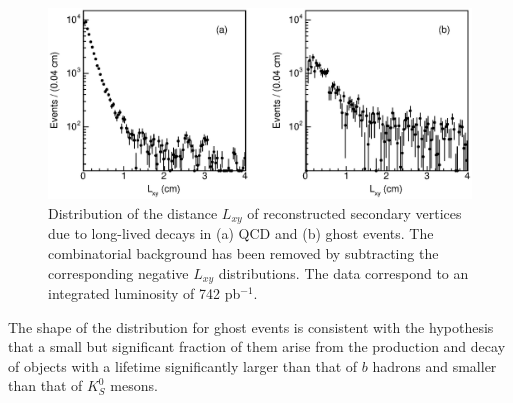\documentclass[aps,prd,preprint,floatfix,nofootinbib,superscriptaddress,showpacs,amssymb]{revtex4}
\begin{document}
 \begin{figure}
 \begin{center}
 \vspace{-0.3in}
 \leavevmode
 \includegraphics*[width=\textwidth]{nvilxy.eps}
 \caption[]{Distribution of the distance $L_{xy}$ of reconstructed secondary
            vertices due to long-lived decays in (a) QCD and (b) ghost events.
            The combinatorial background has been removed by subtracting the
            corresponding negative $L_{xy}$ distributions. The data correspond
            to an integrated luminosity of 742 pb$^{-1}$.}
 \label{fig:fig_nvlxy}
 \end{center}
 \end{figure}
 The shape of the distribution for ghost events is consistent with the
 hypothesis that a small but significant
  fraction of them arise from the production and
 decay of objects with a lifetime significantly larger than that of $b$
 hadrons and smaller than that of $K_S^0$ mesons. 
\end{document}
